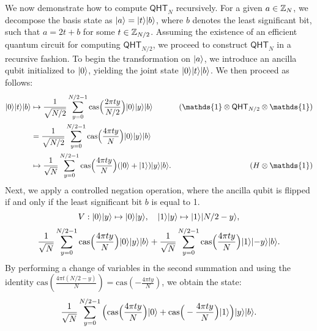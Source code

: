 \documentclass[11pt]{article}
\theoremstyle{definition}
\newcommand{\cas}{\mathrm{cas}}
\newcommand{\qht}{\mathsf{QHT}}
\begin{document}
We now demonstrate how to compute \( \qht_N \) recursively. For a given \( a \in \mathbb{Z}_N \), we decompose the basis state as \( \lvert a\rangle = \lvert t\rangle\lvert b\rangle \), where \( b \) denotes the least significant bit, such that \( a = 2t + b \) for some \( t \in \mathbb{Z}_{N/2} \). Assuming the existence of an efficient quantum circuit for computing \( \qht_{N/2} \), we proceed to construct \( \qht_N \) in a recursive fashion. To begin the transformation on \( \lvert a\rangle \), we introduce an ancilla qubit initialized to \( \lvert0\rangle \), yielding the joint state \( \lvert0\rangle\lvert t\rangle\lvert b\rangle \). We then proceed as follows:
\begin{align*}
	\ket{0}\ket{t}\ket{b}
    & \mapsto \frac{1}{\sqrt{N / 2}} \sum_{y = 0}^{N / 2 - 1} \cas\Big( \frac{2\pi t y}{N / 2} \Big) \ket{0} \ket{y} \ket{b} & (\mathds{1} \otimes \qht_{N / 2} \otimes \mathds{1}) \\
    & = \frac{1}{\sqrt{N / 2}} \sum_{y = 0}^{N / 2 - 1} \cas\Big( \frac{4\pi t y}{N} \Big) \ket{0} \ket{y} \ket{b} \\
    & \mapsto \frac{1}{\sqrt{N}} \sum_{y = 0}^{N / 2 - 1} \cas\Big( \frac{4\pi t y}{N} \Big) (\ket{0} + \ket{1}) \ket{y}\ket{b}. & (H \otimes \mathds{1})
\end{align*}
Next, we apply a controlled negation operation, where the ancilla qubit is flipped if and only if the least significant bit \( b \) is equal to 1.
\[
    V: \lvert0\rangle\lvert y\rangle \mapsto \lvert0\rangle\lvert y\rangle, \quad \lvert1\rangle\lvert y\rangle \mapsto \lvert1\rangle\lvert N / 2 -y\rangle,
\]
\[
    \frac{1}{\sqrt{N}} \sum_{y = 0}^{N / 2 - 1} \cas\Big( \frac{4\pi t y}{N} \Big) \ket{0} \ket{y} \ket{b} + \frac{1}{\sqrt{N}} \sum_{y = 0}^{N / 2 - 1} \cas\Big( \frac{4\pi t y}{N} \Big) \ket{1} \ket{-y} \ket{b}.
\]
By performing a change of variables in the second summation and using the identity \( \cas\left(\frac{4\pi t (N / 2 - y)}{N}\right) = \cas\left(-\frac{4\pi t y}{N}\right) \), we obtain the state:
\[
    \frac{1}{\sqrt{N}} \sum_{y = 0}^{N / 2 - 1} \Big( \cas\Big( \frac{4\pi t y}{N} \Big) \ket{0} + \cas\Big( -\frac{4\pi t y}{N} \Big) \ket{1} \Big) \ket{y} \ket{b}.
\]
\end{document}
